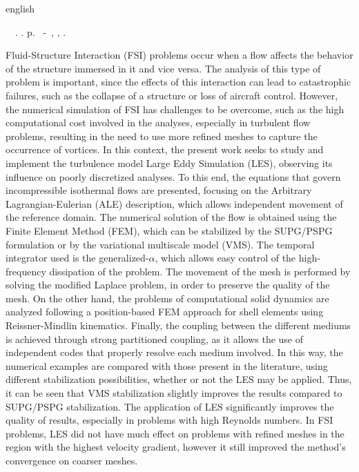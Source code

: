 \begin{resumo}[Abstract]
	\begin{otherlanguage*}{english}
		\begin{flushleft}
			\setlength{\absparsep}{0pt} %
			\SingleSpacing  		\imprimirautorabr~~\textbf{\imprimirtitleabstract}.	\imprimirdata.  \pageref{LastPage} p.
			\imprimirtipotrabalhoabs~-~\imprimirinstituicao, \imprimirlocal, 	\imprimirdata.
		\end{flushleft}
		\OnehalfSpacing

		Fluid-Structure Interaction (FSI) problems occur when a flow affects the behavior of the structure immersed in it and vice versa. The analysis of this type of problem is important, since the effects of this interaction can lead to catastrophic failures, such as the collapse of a structure or loss of aircraft control. However, the numerical simulation of FSI has challenges to be overcome, such as the high computational cost involved in the analyses, especially in turbulent flow problems, resulting in the need to use more refined meshes to capture the occurrence of vortices. In this context, the present work seeks to study and implement the turbulence model Large Eddy Simulation (LES), observing its influence on poorly discretized analyses. To this end, the equations that govern incompressible isothermal flows are presented, focusing on the Arbitrary Lagrangian-Eulerian (ALE) description, which allows independent movement of the reference domain. The numerical solution of the flow is obtained using the Finite Element Method (FEM), which can be stabilized by the SUPG/PSPG formulation or by the variational multiscale model (VMS). The temporal integrator used is the generalized-$\alpha$, which allows easy control of the high-frequency dissipation of the problem. The movement of the mesh is performed by solving the modified Laplace problem, in order to preserve the quality of the mesh. On the other hand, the problems of computational solid dynamics are analyzed following a position-based FEM approach for shell elements using Reissner-Mindlin kinematics. Finally, the coupling between the different mediums is achieved through strong partitioned coupling, as it allows the use of independent codes that properly resolve each medium involved. In this way, the numerical examples are compared with those present in the literature, using different stabilization possibilities, whether or not the LES may be applied. Thus, it can be seen that VMS stabilization slightly improves the results compared to SUPG/PSPG stabilization. The application of LES significantly improves the quality of results, especially in problems with high Reynolds numbers. In FSI problems, LES did not have much effect on problems with refined meshes in the region with the highest velocity gradient, however it still improved the method's convergence on coarser meshes.


\end{otherlanguage*}
\end{resumo}
